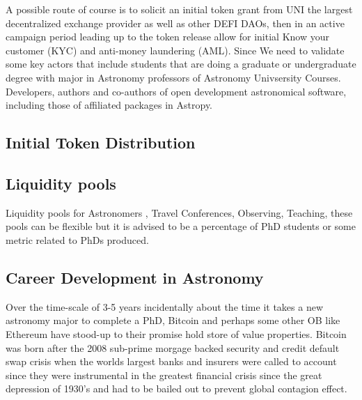 \documentclass[final,5p,times,twocolumn,authoryear]{elsarticle}
\begin{document}
A possible route of course is to solicit an initial token grant from UNI the largest decentralized exchange provider as well as other DEFI DAOs, then in an active campaign period leading up to the token release allow for initial Know your customer (KYC) and anti-money laundering (AML). Since We need to validate some key actors that include students that are doing a graduate or undergraduate degree with major in Astronomy professors of Astronomy Univsersity Courses. Developers, authors and co-authors of open development astronomical software, including those of affiliated packages in Astropy. 

\subsection{Initial Token Distribution}

\subsection{Liquidity pools}

Liquidity pools for Astronomers , Travel Conferences, Observing, Teaching, these pools can be flexible but it is advised to be a percentage of PhD  students or some metric related to PhDs produced. 

\subsection{Career Development in Astronomy}

Over the time-scale of 3-5 years incidentally about the time it takes a new astronomy major to complete a PhD, Bitcoin and perhaps some other OB like Ethereum have stood-up to their promise hold store of value properties. Bitcoin was born after the 2008 sub-prime morgage backed security and credit default swap crisis when the worlds largest banks and insurers were called to account since they were instrumental in the greatest financial crisis since the great depression of 1930's and had to be bailed out to prevent global contagion effect.
 
\end{document}
